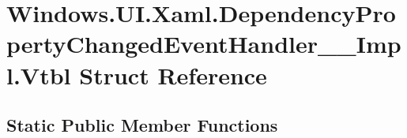 \hypertarget{struct_windows_1_1_u_i_1_1_xaml_1_1_dependency_property_changed_event_handler_____impl_1_1_vtbl}{}\section{Windows.\+U\+I.\+Xaml.\+Dependency\+Property\+Changed\+Event\+Handler\+\_\+\+\_\+\+Impl.\+Vtbl Struct Reference}
\label{struct_windows_1_1_u_i_1_1_xaml_1_1_dependency_property_changed_event_handler_____impl_1_1_vtbl}
\subsection*{Static Public Member Functions}

